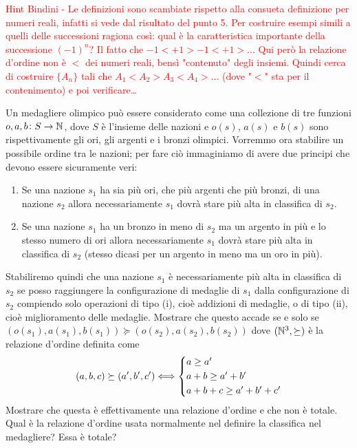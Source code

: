 \textcolor{red}{Hint Bindini -  Le definizioni sono scambiate rispetto alla consueta definizione per numeri reali, infatti si vede dal risultato del punto 5. Per costruire esempi simili a quelli delle successioni ragiona così: qual è la caratteristica importante della successione $ (-1)^n $? Il fatto che $ -1 < +1 > -1 < +1 > \ldots $ Qui però la relazione d'ordine non è $ < $ dei numeri reali, bensì "contenuto" degli insiemi. Quindi cerca di costruire $ \{A_n\} $ tali che $ A_1 < A_2 > A_3 < A_4 > \ldots $ (dove "$ < $" sta per il contenimento) e poi verificare\ldots}


\begin{es}
  Un medagliere olimpico può essere considerato come una collezione di tre funzioni $ o, a, b \colon S \to \mathbb{N} $, dove $ S $ è l'insieme delle nazioni e $ o(s) $, $ a(s) $ e $ b(s) $ sono rispettivamente gli ori, gli argenti e i bronzi olimpici. Vorremmo ora stabilire un possibile ordine tra le nazioni; per fare ciò immaginiamo di avere due principi che devono essere sicuramente veri:
  \begin{enumerate}[label=(\roman*)]
  \item Se una nazione $ s_1 $ ha sia più ori, che più argenti che più bronzi, di una nazione $ s_2 $ allora necessariamente $ s_1 $ dovrà stare più alta in classifica di $ s_2 $.
  \item Se una nazione $ s_1 $ ha un bronzo in meno di $ s_2 $ ma un argento in più e lo stesso numero di ori allora necessariamente $ s_1 $ dovrà stare più alta in classifica di $ s_2 $ (stesso dicasi per un argento in meno ma un oro in più).
  \end{enumerate}
  Stabiliremo quindi che una nazione $ s_1 $ è necessariamente più alta in classifica di $ s_2 $ se posso raggiungere la configurazione di medaglie di $ s_1 $ dalla configurazione di $ s_2 $ compiendo solo operazioni di tipo (i), cioè addizioni di medaglie, o di tipo (ii), cioè miglioramento delle medaglie. Mostrare che questo accade se e solo se $ (o(s_1), a(s_1), b(s_1)) \succeq (o(s_2), a(s_2), b(s_2)) $ dove $ (\mathbb{N}^3, \succeq) $ è la relazione d'ordine definita come
  \[(a, b, c) \succeq (a', b', c') \liff
    \begin{cases*}
      a \geq a' \\
      a + b \geq a' + b' \\
      a + b + c \geq a' + b' + c' \\
    \end{cases*}\]
  Mostrare che questa è effettivamente una relazione d'ordine e che non è totale. Qual è la relazione d'ordine usata normalmente nel definire la classifica nel medagliere? Essa è totale?
\end{es}
